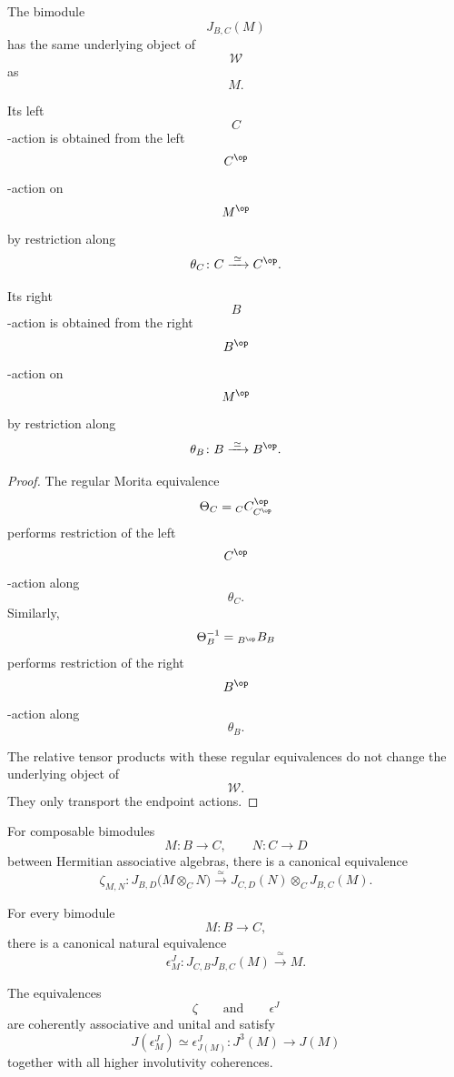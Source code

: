 \begin{proposition}
\label{prop:hermitian-reversal-action-restriction}
The bimodule
\[
    J_{B,C}(M)
\]
has the same underlying object of
\[
    \mathcal W
\]
as
\[
    M.
\]

Its left
\[
    C
\]
-action is obtained from the left
\[
    C^{\op}
\]
-action on
\[
    M^{\op}
\]
by restriction along
\[
    \theta_C
    \colon
    C
    \xrightarrow{\;\simeq\;}
    C^{\op}.
\]

Its right
\[
    B
\]
-action is obtained from the right
\[
    B^{\op}
\]
-action on
\[
    M^{\op}
\]
by restriction along
\[
    \theta_B
    \colon
    B
    \xrightarrow{\;\simeq\;}
    B^{\op}.
\]
\end{proposition}

\begin{proof}
The regular Morita equivalence
\[
    \Theta_C
    =
    {}_C C^{\op}_{C^{\op}}
\]
performs restriction of the left
\[
    C^{\op}
\]
-action along
\[
    \theta_C.
\]
Similarly,
\[
    \Theta_B^{-1}
    =
    {}_{B^{\op}}B_B
\]
performs restriction of the right
\[
    B^{\op}
\]
-action along
\[
    \theta_B.
\]

The relative tensor products with these regular equivalences do not
change the underlying object of
\[
    \mathcal W.
\]
They only transport the endpoint actions.
\end{proof}

\begin{proposition}
\label{prop:coherent-hermitian-reversal}
For composable bimodules
\[
    M
    \colon
    B
    \longrightarrow
    C,
    \qquad
    N
    \colon
    C
    \longrightarrow
    D
\]
between Hermitian associative algebras, there is a canonical equivalence
\[
    \zeta_{M,N}
    \colon
    J_{B,D}
    \bigl(
        M\otimes_CN
    \bigr)
    \xrightarrow{\;\simeq\;}
    J_{C,D}(N)
    \otimes_C
    J_{B,C}(M).
\]

For every bimodule
\[
    M
    \colon
    B
    \longrightarrow
    C,
\]
there is a canonical natural equivalence
\[
    \epsilon^J_M
    \colon
    J_{C,B}J_{B,C}(M)
    \xrightarrow{\;\simeq\;}
    M.
\]

The equivalences
\[
    \zeta
    \qquad\text{and}\qquad
    \epsilon^J
\]
are coherently associative and unital and satisfy
\[
    J(\epsilon^J_M)
    \simeq
    \epsilon^J_{J(M)}
    \colon
    J^3(M)
    \longrightarrow
    J(M)
\]
together with all higher involutivity coherences.
\end{proposition}

